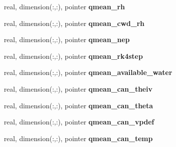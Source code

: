 \begin{DoxyCompactItemize}
\item 
\hypertarget{structed__state__vars_1_1sitetype_a766491ab623effa2425948c2f218c019}{
real, dimension(:,:), pointer {\bfseries qmean\_\-rh}}
\label{structed__state__vars_1_1sitetype_a766491ab623effa2425948c2f218c019}

\item 
\hypertarget{structed__state__vars_1_1sitetype_a542b101de1ca3aa8c26b2977de60c00b}{
real, dimension(:,:), pointer {\bfseries qmean\_\-cwd\_\-rh}}
\label{structed__state__vars_1_1sitetype_a542b101de1ca3aa8c26b2977de60c00b}

\item 
\hypertarget{structed__state__vars_1_1sitetype_affa82092385d46e03a7d6dea33fb2582}{
real, dimension(:,:), pointer {\bfseries qmean\_\-nep}}
\label{structed__state__vars_1_1sitetype_affa82092385d46e03a7d6dea33fb2582}

\item 
\hypertarget{structed__state__vars_1_1sitetype_a7b72648680c543b4a86a9f4861c510d8}{
real, dimension(:,:), pointer {\bfseries qmean\_\-rk4step}}
\label{structed__state__vars_1_1sitetype_a7b72648680c543b4a86a9f4861c510d8}

\item 
\hypertarget{structed__state__vars_1_1sitetype_a398eb050578d793badeef58d10e2aa6f}{
real, dimension(:,:), pointer {\bfseries qmean\_\-available\_\-water}}
\label{structed__state__vars_1_1sitetype_a398eb050578d793badeef58d10e2aa6f}

\item 
\hypertarget{structed__state__vars_1_1sitetype_a9862dc8c9311725de5beaa6bf83752ff}{
real, dimension(:,:), pointer {\bfseries qmean\_\-can\_\-theiv}}
\label{structed__state__vars_1_1sitetype_a9862dc8c9311725de5beaa6bf83752ff}

\item 
\hypertarget{structed__state__vars_1_1sitetype_a70168533ce97e33375f74512b664fb46}{
real, dimension(:,:), pointer {\bfseries qmean\_\-can\_\-theta}}
\label{structed__state__vars_1_1sitetype_a70168533ce97e33375f74512b664fb46}

\item 
\hypertarget{structed__state__vars_1_1sitetype_ad8dd839d590487ae9af0d90360e216f2}{
real, dimension(:,:), pointer {\bfseries qmean\_\-can\_\-vpdef}}
\label{structed__state__vars_1_1sitetype_ad8dd839d590487ae9af0d90360e216f2}

\item 
\hypertarget{structed__state__vars_1_1sitetype_aa134c6e6711c9f4fcbe9a3b3229d1241}{
real, dimension(:,:), pointer {\bfseries qmean\_\-can\_\-temp}}
\label{structed__state__vars_1_1sitetype_aa134c6e6711c9f4fcbe9a3b3229d1241}


\end{DoxyCompactItemize}
